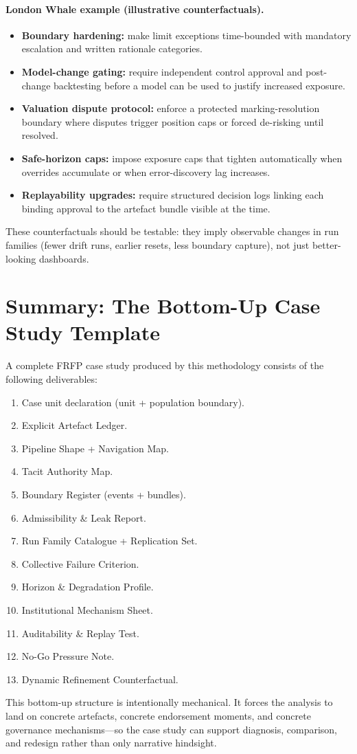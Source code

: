 \paragraph{London Whale example (illustrative counterfactuals).}
\begin{itemize}
  \item \textbf{Boundary hardening:} make limit exceptions time-bounded with mandatory escalation and written rationale categories.
  \item \textbf{Model-change gating:} require independent control approval and post-change backtesting before a model can be used to justify increased exposure.
  \item \textbf{Valuation dispute protocol:} enforce a protected marking-resolution boundary where disputes trigger position caps or forced de-risking until resolved.
  \item \textbf{Safe-horizon caps:} impose exposure caps that tighten automatically when overrides accumulate or when error-discovery lag increases.
  \item \textbf{Replayability upgrades:} require structured decision logs linking each binding approval to the artefact bundle visible at the time.
\end{itemize}

These counterfactuals should be testable: they imply observable changes in run families (fewer drift runs, earlier resets, less boundary capture),
not just better-looking dashboards.

\section{Summary: The Bottom-Up Case Study Template}

A complete FRFP case study produced by this methodology consists of the following deliverables:

\begin{enumerate}
  \item Case unit declaration (unit + population boundary).
  \item Explicit Artefact Ledger.
  \item Pipeline Shape + Navigation Map.
  \item Tacit Authority Map.
  \item Boundary Register (events + bundles).
  \item Admissibility \& Leak Report.
  \item Run Family Catalogue + Replication Set.
  \item Collective Failure Criterion.
  \item Horizon \& Degradation Profile.
  \item Institutional Mechanism Sheet.
  \item Auditability \& Replay Test.
  \item No-Go Pressure Note.
  \item Dynamic Refinement Counterfactual.
\end{enumerate}

This bottom-up structure is intentionally mechanical. It forces the analysis to land on concrete artefacts,
concrete endorsement moments, and concrete governance mechanisms—so the case study can support diagnosis,
comparison, and redesign rather than only narrative hindsight.
